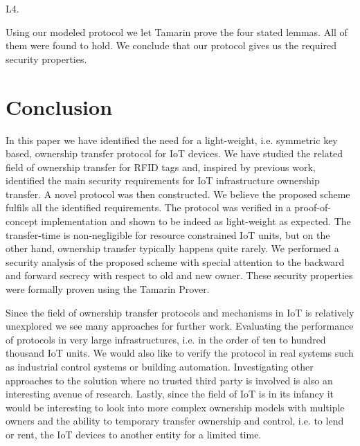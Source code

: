 {\begin{labeling}{L4.}
	
\end{labeling}


Using our modeled protocol we let Tamarin prove the four stated lemmas. All of them were found to hold. We conclude that our protocol gives us the required security properties. 


\section{Conclusion}
\label{sec:ot:Conclusion}
In this paper we have identified the need for a light-weight, i.e. symmetric key based, ownership transfer protocol for IoT devices. We have studied the related field of ownership transfer for RFID tags and, inspired by previous work, identified the main security requirements for IoT infrastructure ownership transfer. A novel protocol was then constructed. We believe the proposed scheme fulfils all the identified requirements. The protocol was verified in a proof-of-concept implementation and shown to be indeed as light-weight as expected. The transfer-time is non-negligible for resource constrained IoT units, but on the other hand, ownership transfer typically happens quite rarely.  We performed a security analysis of the proposed scheme with special attention to the backward and forward secrecy with respect to old and new owner. These security properties were formally proven using the Tamarin Prover. 

Since the field of ownership transfer protocols and mechanisms in IoT is relatively unexplored we see many approaches for further work. Evaluating the performance of protocols in very large infrastructures, i.e. in the order of ten to hundred thousand IoT units. We would also like to verify the protocol in real systems such as industrial control systems or building automation. Investigating other approaches to the solution where no trusted third party is involved is also an interesting avenue of research. Lastly, since the field of IoT is in its infancy it would be interesting to look into more complex ownership models with multiple owners and the ability to temporary transfer ownership and control, i.e. to lend or rent, the IoT devices to another entity for a limited time.

{\raggedright
        \printbibliography[segment=\therefsegment,heading=subbibliography]
}
}





